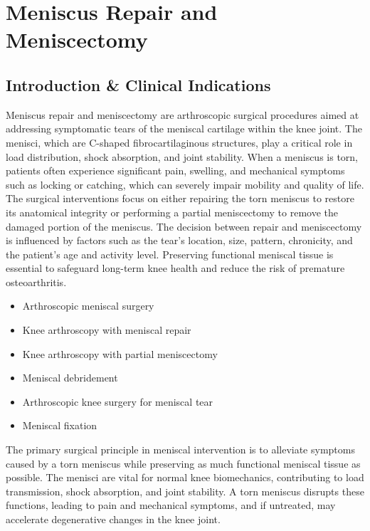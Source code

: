 \chapter{Meniscus Repair and Meniscectomy}

\section*{Introduction \& Clinical Indications}
Meniscus repair and meniscectomy are arthroscopic surgical procedures aimed at addressing symptomatic tears of the meniscal cartilage within the knee joint. The menisci, which are C-shaped fibrocartilaginous structures, play a critical role in load distribution, shock absorption, and joint stability. When a meniscus is torn, patients often experience significant pain, swelling, and mechanical symptoms such as locking or catching, which can severely impair mobility and quality of life. The surgical interventions focus on either repairing the torn meniscus to restore its anatomical integrity or performing a partial meniscectomy to remove the damaged portion of the meniscus. The decision between repair and meniscectomy is influenced by factors such as the tear's location, size, pattern, chronicity, and the patient's age and activity level. Preserving functional meniscal tissue is essential to safeguard long-term knee health and reduce the risk of premature osteoarthritis.

\begin{itemize}
  \item Arthroscopic meniscal surgery
  \item Knee arthroscopy with meniscal repair
  \item Knee arthroscopy with partial meniscectomy
  \item Meniscal debridement
  \item Arthroscopic knee surgery for meniscal tear
  \item Meniscal fixation
\end{itemize}

The primary surgical principle in meniscal intervention is to alleviate symptoms caused by a torn meniscus while preserving as much functional meniscal tissue as possible. The menisci are vital for normal knee biomechanics, contributing to load transmission, shock absorption, and joint stability. A torn meniscus disrupts these functions, leading to pain and mechanical symptoms, and if untreated, may accelerate degenerative changes in the knee joint.

